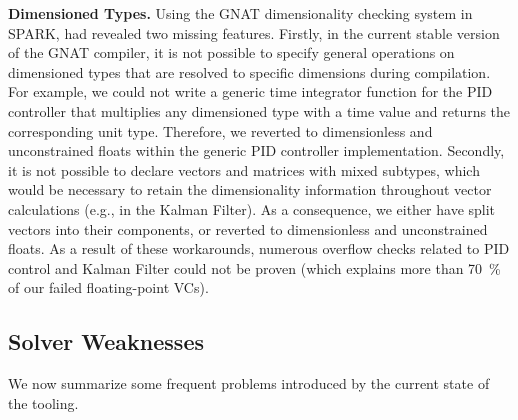 \textbf{Dimensioned Types.}
Using the GNAT dimensionality checking system in SPARK, had revealed two missing features. Firstly, in the current stable version of the GNAT compiler, it is not possible to specify general operations on dimensioned types that are resolved to specific dimensions during compilation.
For example, we could not write a generic time integrator function for the PID controller that multiplies any dimensioned type with a time value and returns the corresponding unit type. Therefore, we reverted to dimensionless and unconstrained floats within the generic PID controller implementation. 
Secondly, it is not possible to declare vectors and matrices with mixed subtypes, which would be necessary to retain the dimensionality information throughout vector calculations (e.g., in the Kalman Filter). As a consequence, we either have split vectors into their components, or reverted to dimensionless and unconstrained floats. %
As a result of these workarounds, %
numerous overflow checks related to PID control and Kalman Filter could not be proven (which explains more than \SI{70}{\percent} of our failed floating-point VCs). %



\subsection{Solver Weaknesses}
We now summarize some frequent problems introduced by the current
state of the tooling. %

